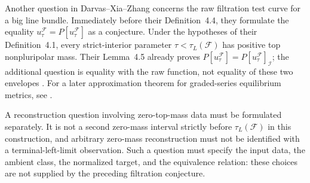 Another question in Darvas--Xia--Zhang concerns the raw filtration test
curve for a big line bundle. Immediately before their Definition~4.4,
they formulate the equality
\(u_\tau^{\mathcal F}=P[u_\tau^{\mathcal F}]\) as a conjecture.
Under the hypotheses of their Definition~4.1, every strict-interior
parameter \(\tau<\tau_L(\mathcal F)\) has positive top nonpluripolar
mass. Their Lemma~4.5 already proves
\(P[u_\tau^{\mathcal F}]=P[u_\tau^{\mathcal F}]_{\mathcal I}\);
the additional question is equality with the raw function, not equality
of these two envelopes
\cite[Definition~4.3, the paragraph before Definition~4.4,
Lemma~4.5, and the proof of Proposition~4.6]{DXZ23}.
For a later approximation theorem for graded-series equilibrium metrics,
see \cite[Theorem~4.3]{Finski26Kodaira}.

A reconstruction question involving zero-top-mass data must be formulated
separately. It is not a second zero-mass interval strictly before
\(\tau_L(\mathcal F)\) in this construction, and arbitrary zero-mass
reconstruction must not be identified with a terminal-left-limit
observation. Such a question must specify the input data, the ambient
class, the normalized target, and the equivalence relation: these choices
are not supplied by the preceding filtration conjecture.
